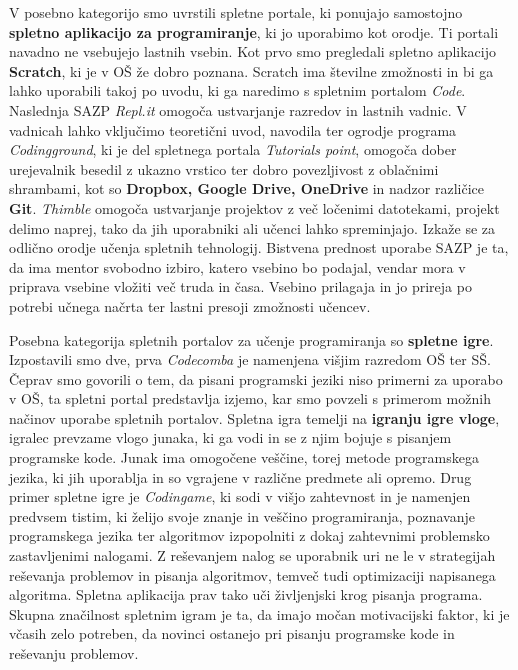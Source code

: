 V posebno kategorijo smo uvrstili spletne portale, ki ponujajo
samostojno \textbf{spletno aplikacijo za programiranje}, ki jo
uporabimo kot orodje. Ti portali navadno ne vsebujejo lastnih
vsebin. Kot prvo smo pregledali spletno aplikacijo \textbf{Scratch}, ki
je v OŠ že dobro poznana. Scratch ima številne zmožnosti in bi ga
lahko uporabili takoj po uvodu, ki ga naredimo s spletnim portalom
\emph{Code}. Naslednja SAZP \emph{Repl.it} omogoča ustvarjanje
razredov in lastnih vadnic. V vadnicah lahko vključimo teoretični
uvod, navodila ter ogrodje programa \emph{Codingground}, ki je del
spletnega portala \emph{Tutorials point}, omogoča dober urejevalnik
besedil z ukazno vrstico ter dobro povezljivost z oblačnimi shrambami,
kot so \textbf{Dropbox, Google Drive, OneDrive} in nadzor različice
\textbf{Git}. \emph{Thimble} omogoča ustvarjanje projektov z več
ločenimi datotekami, projekt delimo naprej, tako da jih uporabniki ali
učenci lahko spreminjajo. Izkaže se za odlično orodje učenja spletnih
tehnologij. Bistvena prednost uporabe SAZP je ta, da ima mentor
svobodno izbiro, katero vsebino bo podajal, vendar mora v priprava
vsebine vložiti več truda in časa. Vsebino prilagaja in jo prireja po
potrebi učnega načrta ter lastni presoji zmožnosti učencev.

Posebna kategorija spletnih portalov za učenje programiranja so
\textbf{spletne igre}. Izpostavili smo dve, prva \emph{Codecomba} je
namenjena višjim razredom OŠ ter SŠ. Čeprav smo govorili o tem, da
pisani programski jeziki niso primerni za uporabo v OŠ, ta spletni
portal predstavlja izjemo, kar smo povzeli s primerom možnih načinov
uporabe spletnih portalov. Spletna igra temelji na \textbf{igranju
  igre vloge}, igralec prevzame vlogo junaka, ki ga vodi in se z njim
bojuje s pisanjem programske kode. Junak ima omogočene veščine, torej
metode programskega jezika, ki jih uporablja in so vgrajene v različne
predmete ali opremo. Drug primer spletne igre je \emph{Codingame}, ki
sodi v višjo zahtevnost in je namenjen predvsem tistim, ki želijo
svoje znanje in veščino programiranja, poznavanje programskega jezika
ter algoritmov izpopolniti z dokaj zahtevnimi problemsko zastavljenimi
nalogami. Z reševanjem nalog se uporabnik uri ne le v strategijah
reševanja problemov in pisanja algoritmov, temveč tudi optimizaciji
napisanega algoritma. Spletna aplikacija prav tako uči življenjski
krog pisanja programa. Skupna značilnost spletnim igram je ta, da
imajo močan motivacijski faktor, ki je včasih zelo potreben, da
novinci ostanejo pri pisanju programske kode in reševanju
problemov.

